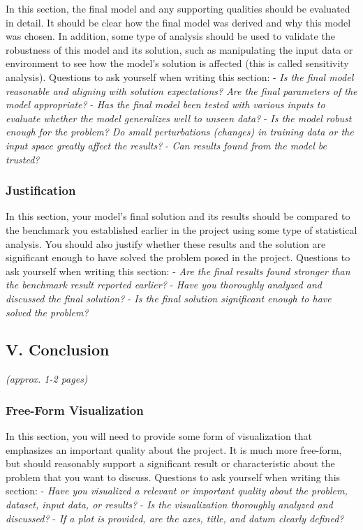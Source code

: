 \documentclass[]{report}
\begin{document}
In this section, the final model and any supporting qualities should be
evaluated in detail. It should be clear how the final model was derived
and why this model was chosen. In addition, some type of analysis should
be used to validate the robustness of this model and its solution, such
as manipulating the input data or environment to see how the model's
solution is affected (this is called sensitivity analysis). Questions to
ask yourself when writing this section: - \emph{Is the final model
reasonable and aligning with solution expectations? Are the final
parameters of the model appropriate?} - \emph{Has the final model been
tested with various inputs to evaluate whether the model generalizes
well to unseen data?} - \emph{Is the model robust enough for the
problem? Do small perturbations (changes) in training data or the input
space greatly affect the results?} - \emph{Can results found from the
model be trusted?}

\subsubsection{Justification}\label{justification}

In this section, your model's final solution and its results should be
compared to the benchmark you established earlier in the project using
some type of statistical analysis. You should also justify whether these
results and the solution are significant enough to have solved the
problem posed in the project. Questions to ask yourself when writing
this section: - \emph{Are the final results found stronger than the
benchmark result reported earlier?} - \emph{Have you thoroughly analyzed
and discussed the final solution?} - \emph{Is the final solution
significant enough to have solved the problem?}

\subsection{V. Conclusion}\label{v.-conclusion}

\emph{(approx. 1-2 pages)}

\subsubsection{Free-Form Visualization}\label{free-form-visualization}

In this section, you will need to provide some form of visualization
that emphasizes an important quality about the project. It is much more
free-form, but should reasonably support a significant result or
characteristic about the problem that you want to discuss. Questions to
ask yourself when writing this section: - \emph{Have you visualized a
relevant or important quality about the problem, dataset, input data, or
results?} - \emph{Is the visualization thoroughly analyzed and
discussed?} - \emph{If a plot is provided, are the axes, title, and
datum clearly defined?}
\end{document}
